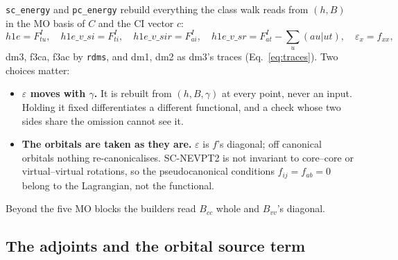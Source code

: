 \documentclass[11pt]{article}
\newcommand{\code}[1]{\texttt{#1}}
\newcommand{\eps}{\varepsilon}
\begin{document}
\code{sc\_energy} and \code{pc\_energy} rebuild everything the class walk
reads from $(h, B)$ in the MO basis of $C$ and the CI vector $c$:
\begin{equation}
  h1e = F^I_{tu},\quad h1e\_v\_si = F^I_{ti},\quad h1e\_v\_sir = F^I_{ai},\quad
  h1e\_v\_sr = F^I_{at} - \sum_u(au|ut),\quad \eps_x = f_{xx},
\end{equation}
dm3, f3ca, f3ac by \code{rdms}, and dm1, dm2 as dm3's traces
(Eq.~\eqref{eq:traces}). Two choices matter:
\begin{itemize}
\item \textbf{$\eps$ moves with $\gamma$.} It is rebuilt from $(h, B, \gamma)$
  at every point, never an input. Holding it fixed differentiates a
  different functional, and a check whose two sides share the omission
  cannot see it.
\item \textbf{The orbitals are taken as they are.} $\eps$ is $f$'s diagonal;
  off canonical orbitals nothing re-canonicalises. SC-NEVPT2 is not invariant
  to core--core or virtual--virtual rotations, so the pseudocanonical
  conditions $f_{ij} = f_{ab} = 0$ belong to the Lagrangian, not the
  functional.
\end{itemize}
Beyond the five MO blocks the builders read $B_{cc}$ whole and $B_{vv}$'s
diagonal.

\subsection{The adjoints and the orbital source term}
\label{sec:adjoints}
\end{document}
